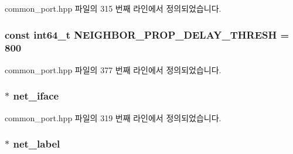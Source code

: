 common\+\_\+port.\+hpp 파일의 315 번째 라인에서 정의되었습니다.

\subsubsection[{\texorpdfstring{N\+E\+I\+G\+H\+B\+O\+R\+\_\+\+P\+R\+O\+P\+\_\+\+D\+E\+L\+A\+Y\+\_\+\+T\+H\+R\+E\+SH}{NEIGHBOR_PROP_DELAY_THRESH}}]{\setlength{\rightskip}{0pt plus 5cm}const {\bf int64\+\_\+t} N\+E\+I\+G\+H\+B\+O\+R\+\_\+\+P\+R\+O\+P\+\_\+\+D\+E\+L\+A\+Y\+\_\+\+T\+H\+R\+E\+SH = 800\hspace{0.3cm}{\ttfamily [static]}}\hypertarget{class_common_port_ad2b817903e69443f936de3f2d195184d}{}\label{class_common_port_ad2b817903e69443f936de3f2d195184d}


common\+\_\+port.\+hpp 파일의 377 번째 라인에서 정의되었습니다.

\subsubsection[{\texorpdfstring{net\+\_\+iface}{net_iface}}]{$\ast$ net\+\_\+iface\hspace{0.3cm}{\ttfamily [private]}}\hypertarget{class_common_port_a7bc95d8cb3e95a8e7f9c5dc261289e37}{}\label{class_common_port_a7bc95d8cb3e95a8e7f9c5dc261289e37}


common\+\_\+port.\+hpp 파일의 319 번째 라인에서 정의되었습니다.

\subsubsection[{\texorpdfstring{net\+\_\+label}{net_label}}]{$\ast$ net\+\_\+label\hspace{0.3cm}{\ttfamily [private]}}\hypertarget{class_common_port_a5885d7a835513edd0bbb0a170b4c9f01}{}\label{class_common_port_a5885d7a835513edd0bbb0a170b4c9f01}


